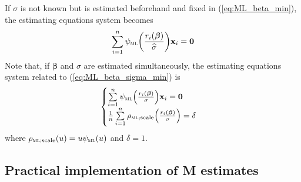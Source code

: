 If $\sigma$ is not known but is estimated beforehand and fixed in
(\ref{eq:ML_beta_min}), the estimating equations system becomes
\[
    \sum_{i=1}^{n} \psi_{\stsc{ML}}\left(\frac{r_{i}(\boldsymbol\beta)}{\sthat{\sigma}}\right) \stvec{x}_{i} = \stvec{0}
\]
Note that, if $\boldsymbol\beta$ and $\sigma$ are estimated simultaneously,
the estimating equations system related to (\ref{eq:ML_beta_sigma_min}) is
%
\begin{equation}\label{eq:ML_beta_sigma_equations}
    \begin{cases}
        \sum\limits_{i=1}^{n} \psi_{\stsc{ML}}\left(\frac{r_{i}(\boldsymbol\beta)}{\sigma}\right) \stvec{x}_{i} = \stvec{0}\\
        \frac{1}{n} \sum\limits_{i=1}^{n} \rho_{\stsc{ML};\mathrm{scale}}\left(\frac{r_{i}(\boldsymbol\beta)}{\sigma}\right) = \delta
    \end{cases}
\end{equation}
%
where $\rho_{\stsc{ML};\mathrm{scale}}(u) = u\psi_{\stsc{ML}}(u)$ and
$\delta=1$.

\subsection{Practical implementation of M estimates}
\label{subsec:practical_implementation_Mestimate}

